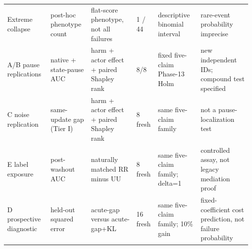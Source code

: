 \begin{table}[t]
{\begin{tabular}{p{2.3cm}p{2.1cm}p{3.0cm}p{1.0cm}p{2.5cm}p{2.8cm}}
Extreme collapse & post-hoc phenotype count & flat-score phenotype, not all failures & 1 / 44 & descriptive binomial interval & rare-event probability imprecise \\
A/B pause replications & native + state-pause AUC & harm + actor effect + paired Shapley rank & 8/8 & fixed five-claim Phase-13 Holm & new independent IDs; compound test specified \\
C noise replication & same-update gap (Tier I) & harm + actor effect + paired Shapley rank & 8 fresh & same five-claim family & not a pause-localization test \\
E label exposure & post-washout AUC & naturally matched RR minus UU & 8 fresh & same five-claim family; delta=1 & controlled assay, not legacy mediation proof \\
D prospective diagnostic & held-out squared error & acute-gap versus acute-gap+KL & 16 fresh & same five-claim family; 10\% gain & fixed-coefficient cost prediction, not failure probability \\
\bottomrule
\end{tabular}}
\end{table}
